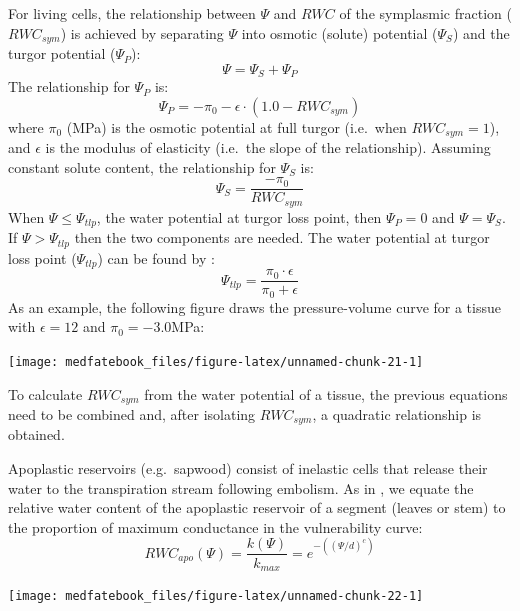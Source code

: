 \documentclass[]{book}
\begin{document}
For living cells, the relationship between \(\Psi\) and \(RWC\) of the symplasmic fraction (\(RWC_{sym}\)) is achieved by separating \(\Psi\) into osmotic (solute) potential (\(\Psi_{S}\)) and the turgor potential (\(\Psi_{P}\)):
\begin{equation}
\Psi = \Psi_{S} + \Psi_{P}
\end{equation}
The relationship for \(\Psi_{P}\) is:
\begin{equation}
\Psi_{P} = -\pi_0 -\epsilon\cdot (1.0 - RWC_{sym})
\end{equation}
where \(\pi_0\) (MPa) is the osmotic potential at full turgor (i.e.~when \(RWC_{sym} = 1\)), and \(\epsilon\) is the modulus of elasticity (i.e.~the slope of the relationship). Assuming constant solute content, the relationship for \(\Psi_{S}\) is:
\begin{equation}
\Psi_{S} = \frac{-\pi_0}{RWC_{sym}} 
\end{equation}
When \(\Psi \leq \Psi_{tlp}\), the water potential at turgor loss point, then \(\Psi_{P} = 0\) and \(\Psi = \Psi_{S}\). If \(\Psi > \Psi_{tlp}\) then the two components are needed. The water potential at turgor loss point (\(\Psi_{tlp}\)) can be found by \citep{Bartlett2012}:
\begin{equation}
\Psi_{tlp} = \frac{\pi_0 \cdot \epsilon}{\pi_0 + \epsilon}
\end{equation}
As an example, the following figure draws the pressure-volume curve for a tissue with \(\epsilon = 12\) and \(\pi_0 = -3.0\)MPa:

\begin{center}\texttt{[image: medfatebook\_files/figure-latex/unnamed-chunk-21-1]} \end{center}

To calculate \(RWC_{sym}\) from the water potential of a tissue, the previous equations need to be combined and, after isolating \(RWC_{sym}\), a quadratic relationship is obtained.

Apoplastic reservoirs (e.g.~sapwood) consist of inelastic cells that release their water to the transpiration stream following embolism. As in \citet{Holtta2009}, we equate the relative water content of the apoplastic reservoir of a segment (leaves or stem) to the proportion of maximum conductance in the vulnerability curve:
\begin{equation}
RWC_{apo}(\Psi) = \frac{k(\Psi)}{k_{max}} = e^{-((\Psi/d)^{c})}
\end{equation}

\begin{center}\texttt{[image: medfatebook\_files/figure-latex/unnamed-chunk-22-1]} \end{center}
\end{document}
